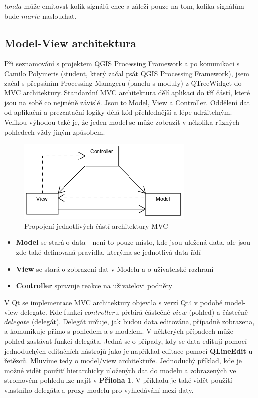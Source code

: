 \noindent $tonda$ může emitovat kolik signálů chce a záleží pouze na tom, kolika signálům bude $marie$ naslouchat.

\subsection{Model-View architektura}
Při seznamování s projektem QGIS Processing Framework a po komunikaci s Camilo Polymeris (student, který začal psát QGIS Processing Framework), jsem začal s přepsáním Processing Manageru (panelu s moduly) z QTreeWidget do MVC architektury. Standardní MVC architektura dělí aplikaci do tří částí, které jsou na sobě co nejméně závislé. Jsou to Model, View a Controller. Oddělení dat od aplikační a prezentační logiky dělá kód přehlednější a lépe udržitelným. Velikou výhodou také je, že jeden model se může zobrazit v několika různých pohledech vždy jiným způsobem.

\begin{figure}[h]
	\centering
	\includegraphics[scale=0.7]{pictures/qt/mvc}
	\caption{Propojení jednotlivých částí architektury MVC}
	\label{mvc}
\end{figure}

\begin{itemize}
	\item{\textbf{Model}} se stará o data - není to pouze místo, kde jsou uložená data, ale jsou zde také definovaná pravidla, kterýma se jednotlivá data řídí
	\item{\textbf{View}} se stará o zobrazení dat v Modelu a o uživatelské rozhraní
	\item{\textbf{Controller}} spravuje reakce na uživatelovi podněty %
\end{itemize}

V Qt se implementace MVC architektury objevila s verzí Qt4 v podobě model-view-delegate. Kde funkci $controller$u přebírá částečně $view$ (pohled) a částečně $delegate$ (delegát). Delegát určuje, jak budou data editována, případně zobrazena, a komunikuje přímo s pohledem a s modelem. V některých případech může pohled zastávat funkci delegáta. Jedná se o případy, kdy se data editují pomocí jednoduchých editačních nástrojů jako je například editace pomocí \textbf{QLineEdit} u řetězců. Mluvíme tedy o model/view architektuře. Jednoduchý příklad, kde je možné vidět použití hierarchicky uložených dat do modelu a zobrazených ve stromovém pohledu lze najít v \textbf{Příloha 1}. V příkladu je také vidět použití vlastního delegáta a proxy modelu pro vyhledávání mezi daty.

